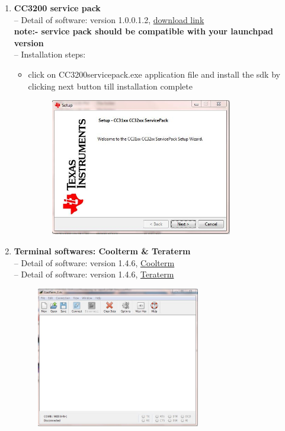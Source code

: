 \documentclass[a4paper,12pt,oneside]{book}
\begin{document}
\begin{enumerate}
\begin{itemize}
\begin{figure}[h]
	 \end{figure}
\end{itemize}
\newpage
\item\textbf{ CC3200 service pack} \\
-- Detail of software: version 1.0.0.1.2, \href{http://www.ti.com}{download link}\\
   \textbf{note:- service pack should be compatible with your launchpad version}\\
-- Installation steps:
\begin{itemize}
	\item click on CC3200servicepack.exe application file and install the sdk by clicking next button till installation complete
	\begin{figure}[h]
		\hspace{2cm}
		\includegraphics[width=300px]{service1}
	\end{figure}
\end{itemize}
\newpage
\item\textbf{ Terminal softwares: Coolterm \& Teraterm} \\
-- Detail of software: version 1.4.6, \href{http://www.coolterm.com}{Coolterm}\\
-- Detail of software: version 1.4.6, \href{http://www.coolterm.com}{Teraterm}\\
	\begin{figure}[h]
		\hspace{2cm}
		\includegraphics[width=270px]{inst16}

\end{figure}
\end{enumerate}
\end{document}

